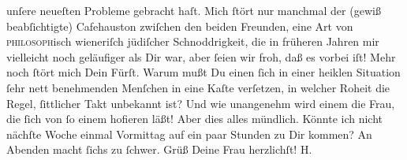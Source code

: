 \begin{ledgroupsized}[t]{13cm}
               unſere neueſten Probleme gebracht haſt. Mich ſtört nur manchmal der (gewiß
               beabſichtigte) Cafehauston zwiſchen den beiden Freunden, eine Art von \textsc{philosoph}isch wieneriſch
               jüdiſcher Schnoddrigkeit, die in früheren Jahren mir vielleicht noch geläufiger als
               Dir war, aber ſeien wir froh, daß es vorbei iſt! Mehr noch ſtört mich Dein Fürſt. Warum mußt Du einen ſich in
               einer heiklen Situation ſehr nett benehmenden Menſchen in eine Kaſte verſetzen, in
               welcher Roheit die Regel, ſittlicher Takt unbekannt ist? Und wie unangenehm wird
               einem die Frau, die ſich von ſo einem hofieren läßt! Aber dies alles mündlich. Könnte
               ich nicht nächſte Woche einmal Vormittag auf ein paar Stunden zu Dir kommen? An
               Abenden macht ſichs zu ſchwer. Grüß Deine Frau herzlichſt! \spacefill\mbox{H.}\pend
           
         
         \endnumbering{}\end{ledgroupsized}  \newcommand{\dateiname}{L01550}\newcommand{\titel}{Hermann Bahr an Arthur Schnitzler, 20. 9. 1905}\newcommand{\editorInnen}{ Kurt Ifkovits,  Martin Anton Müller}
      